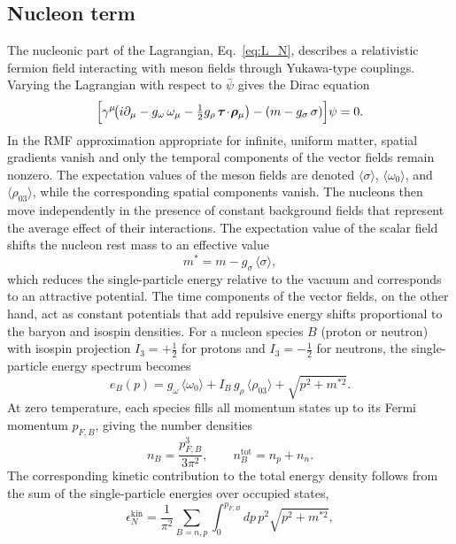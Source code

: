 \subsection*{Nucleon term}
\label{subsec:nucleon_term}

The nucleonic part of the Lagrangian, Eq.~\eqref{eq:L_N}, describes a relativistic
fermion field interacting with meson fields through Yukawa-type couplings.
Varying the Lagrangian with respect to $\bar\psi$ gives the Dirac equation
\begin{equation}
\Bigl[\gamma^\mu\!\bigl(i\partial_\mu - g_\omega\,\omega_\mu - \tfrac{1}{2}g_\rho\,\boldsymbol{\tau}\!\cdot\!\boldsymbol{\rho}_\mu\bigr)
 - (m - g_\sigma\,\sigma)\Bigr]\psi = 0.
\end{equation}
In the RMF approximation appropriate for infinite, uniform matter, spatial
gradients vanish and only the temporal components of the vector fields remain
nonzero. The expectation values of the meson fields are denoted
$\langle\sigma\rangle$, $\langle\omega_0\rangle$, and
$\langle\rho_{03}\rangle$, while the corresponding spatial
components vanish. The nucleons then move independently in the presence of
constant background fields that represent the average effect of their
interactions. The expectation value of the scalar field shifts the nucleon
rest mass to an effective value
\begin{equation}
m^{*} = m - g_\sigma\,\langle\sigma\rangle,
\end{equation}
which reduces the single-particle energy relative to the vacuum and
corresponds to an attractive potential. The time components of the vector
fields, on the other hand, act as constant potentials that add repulsive
energy shifts proportional to the baryon and isospin densities. For a nucleon
species $B$ (proton or neutron) with isospin projection $I_3 = +\tfrac{1}{2}$
for protons and $I_3 = -\tfrac{1}{2}$ for neutrons, the single-particle energy
spectrum becomes
\begin{equation}
e_B(p) = g_\omega\,\langle\omega_0\rangle + I_B\,g_\rho\,\langle\rho_{03}\rangle
         + \sqrt{p^{2} + m^{*2}}.
\label{eq:single_particle_energy}
\end{equation}
At zero temperature, each species fills all momentum states up to its Fermi
momentum $p_{F,B}$, giving the number densities
\[
n_B = \frac{p_{F,B}^{3}}{3\pi^{2}}, \qquad
n_B^{\mathrm{tot}} = n_p + n_n.
\]
The corresponding kinetic contribution to the total energy density follows from
the sum of the single-particle energies over occupied states,
\begin{equation}
\epsilon_{N}^{\mathrm{kin}}
  = \frac{1}{\pi^{2}}\sum_{B=n,p}
    \int_{0}^{p_{F,B}}\!dp\,p^{2}\sqrt{p^{2} + m^{*2}},
\label{eq:epsilon_nucleon}
\end{equation}
